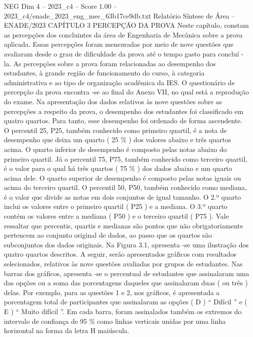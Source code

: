 \begin{textsample}{NEG Dim 4 – 2023\_c4 – Score 1.00 – 2023\_c4/enade\_2023\_eng\_mec\_63b17ce9db.txt}  \label{ex:f4_neg_194}
Relatório Síntese de Área – ENADE/2023 CAPÍTULO 3 PERCEPÇÃO DA PROVA Neste capítulo, constam as percepções dos concluintes da área de Engenharia de Mecânica sobre a prova aplicada.
Essas percepções foram mensuradas por meio de nove questões que avaliaram desde o grau de dificuldade da prova até o tempo gasto para concluí -la.
As percepções sobre a prova foram relacionadas ao desempenho dos estudantes, à grande região de funcionamento do curso, à categoria administrativa e ao tipo de organização acadêmica da IES.
O questionário de percepção da prova encontra -se ao final do Anexo VII, no qual está a reprodução do exame.
Na apresentação dos dados relativos às nove questões sobre as percepções a respeito da prova, o desempenho dos estudantes foi classificado em quatro quartos.
Para tanto, esse desempenho foi ordenado de forma ascendente.
O percentil 25, P25, também conhecido como primeiro quartil, é a nota de desempenho que deixa um quarto ( 25 \% ) dos valores abaixo e três quartos acima.
O quarto inferior de desempenho é composto pelas notas abaixo do primeiro quartil.
Já o percentil 75, P75, também conhecido como terceiro quartil, é o valor para o qual há três quartos ( 75 \% ) dos dados abaixo e um quarto acima dele.
O quarto superior de desempenho é composto pelas notas iguais ou acima do terceiro quartil.
O percentil 50, P50, também conhecido como mediana, é o valor que divide as notas em dois conjuntos de igual tamanho.
O 2.º quarto inclui os valores entre o primeiro quartil ( P25 ) e a mediana.
O 3.º quarto contém os valores entre a mediana ( P50 ) e o terceiro quartil ( P75 ).
Vale ressaltar que percentis, quartis e medianas são pontos que não obrigatoriamente pertencem ao conjunto original de dados, ao passo que os quartos são subconjuntos dos dados originais.
Na Figura 3.1, apresenta -se uma ilustração dos quatro quartos descritos.
A seguir, serão apresentados gráficos com resultados selecionados, relativos às nove questões avaliadas por grupos de estudantes.
Nas barras dos gráficos, apresenta -se o percentual de estudantes que assinalaram uma das opções ou a soma das porcentagens daqueles que assinalaram duas ( ou três ) delas.
Por exemplo, para as questões 1 e 2, nos gráficos, é apresentada a porcentagem total de participantes que assinalaram as opções ( D ) “ Difícil ” e ( E ) “ Muito difícil ”.
Em cada barra, foram assinalados também os extremos do intervalo de confiança de 95 \% como linhas verticais unidas por uma linha horizontal na forma da letra H maiúscula.

\end{textsample}
